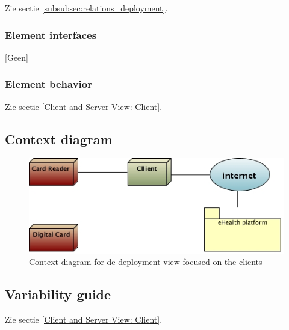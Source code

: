 \documentclass[a4paper,10pt]{article}
\begin{document}
Zie sectie \ref{subsubsec:relations_deployment}.

\subsubsection*{Element interfaces}

[Geen]

\subsubsection*{Element behavior}

Zie sectie \ref{Client and Server View: Client}.
\clearpage
\subsection{Context diagram}

\begin{center}
    \begin{figure}[!h]
      \includegraphics[width=\textwidth]{../images/deployment_clients_context.jpg}
	\caption{Context diagram for de deployment view focused on the clients}
    \end{figure}
  \end{center}

\subsection{Variability guide}
Zie sectie \ref{Client and Server View: Client}.
\end{document}
